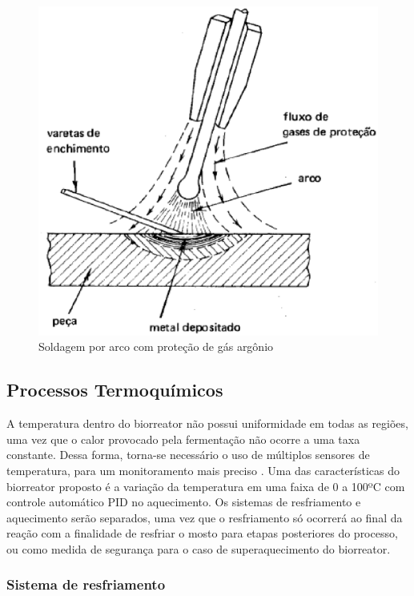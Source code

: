 \begin{figure}[h]
 \centering
 \includegraphics[keepaspectratio=true,scale=0.5]{figuras/contorno.eps}
 \caption{Soldagem por arco com proteção de gás argônio}
 \label{contorno}
\end{figure}

\subsection{Processos Termoquímicos}

A temperatura dentro do biorreator não possui uniformidade em todas as regiões, uma vez que o calor provocado pela fermentação não ocorre a uma taxa constante. Dessa forma, torna-se necessário o uso de múltiplos sensores de temperatura, para um monitoramento mais preciso \cite{silveira2009analise}. Uma das características do biorreator proposto é a variação da temperatura em uma faixa de 0 a 100ºC com controle automático PID no aquecimento. Os sistemas de resfriamento e aquecimento serão separados, uma vez que o resfriamento só ocorrerá ao final da reação com a finalidade de resfriar o mosto para etapas posteriores do processo, ou como medida de segurança para o caso de superaquecimento do biorreator.

\subsubsection{Sistema de resfriamento}

